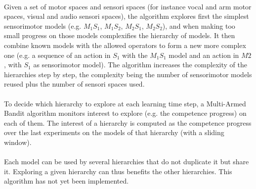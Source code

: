 \documentclass[12pt]{article}
\begin{document}
			\paragraph{}
			Given a set of motor spaces and sensori spaces (for instance vocal and arm motor spaces, visual and audio sensori spaces), the algorithm
			explores first the simplest sensorimotor models (e.g. $M_1S_1$, $M_1S_2$, $M_2S_1$, $M_2S_2$), and when making too small progress on those models
			complexifies the hierarchy of models.
			It then combine known models with the allowed operators to form a new more complex one (e.g. a sequence of an action in $S_1$ with the $M_1S_1$ 
			model and an action in $M2$, with $S_1$ as sensorimotor model).
			The algorithm increases the complexity of the hierarchies step by step, the complexity being the number of sensorimotor models 
			reused plus the number of sensori spaces used.
			
			\paragraph{}
			To decide which hierarchy to explore at each learning time step, a Multi-Armed Bandit algorithm monitors interest to explore (e.g. the competence progress) on each of them.
			The interest of a hierarchy is computed as the competence progress over the last experiments 
			on the models of that hierarchy (with a sliding window).
			
			\paragraph{}
			Each model can be used by several hierarchies that do not duplicate it but share it. Exploring a given hierarchy can thus benefits the other hierarchies.			
			This algorithm has not yet been implemented.
			
\end{document}
